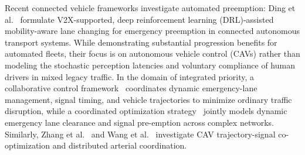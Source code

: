 \documentclass[journal,10pt,twocolumn]{IEEEtran}
\begin{document}
Recent connected vehicle frameworks investigate automated preemption: Ding et al.~\cite{ding2024} formulate V2X-supported, deep reinforcement learning (DRL)-assisted mobility-aware lane changing for emergency preemption in connected autonomous transport systems. While demonstrating substantial progression benefits for automated fleets, their focus is on autonomous vehicle control (CAVs) rather than modeling the stochastic perception latencies and voluntary compliance of human drivers in mixed legacy traffic. In the domain of integrated priority, a collaborative control framework~\cite{collaborative_control_2024} coordinates dynamic emergency-lane management, signal timing, and vehicle trajectories to minimize ordinary traffic disruption, while a coordinated optimization strategy~\cite{coordinated_preemption_2026} jointly models dynamic emergency lane clearance and signal pre-emption across complex networks. Similarly, Zhang et al.~\cite{zhang2024collaborative} and Wang et al.~\cite{wang2026coordinated} investigate CAV trajectory-signal co-optimization and distributed arterial coordination.
\end{document}
